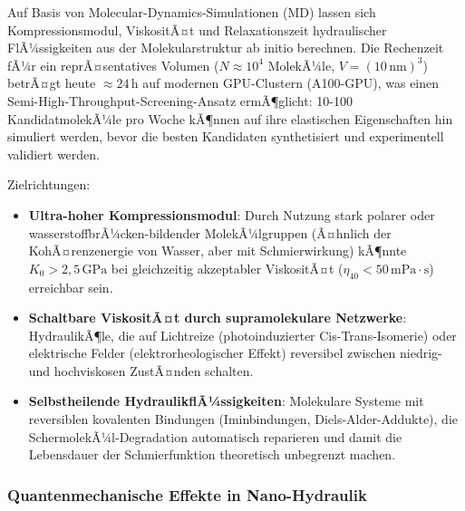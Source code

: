 ﻿\documentclass[a4paper,12pt]{scrreprt}
\theoremstyle{definition}
\begin{document}
Auf Basis von Molecular-Dynamics-Simulationen (MD) lassen sich
Kompressionsmodul, ViskositÃ¤t und Relaxationszeit hydraulischer
FlÃ¼ssigkeiten aus der Molekularstruktur ab initio berechnen.
Die Rechenzeit fÃ¼r ein reprÃ¤sentatives Volumen
($N \approx 10^4$ MolekÃ¼le, $V = (10\,\mathrm{nm})^3$) betrÃ¤gt
heute $\approx 24\,\mathrm{h}$ auf modernen GPU-Clustern (A100-GPU),
was einen Semi-High-Throughput-Screening-Ansatz ermÃ¶glicht:
10-100 KandidatmolekÃ¼le pro Woche kÃ¶nnen auf ihre elastischen
Eigenschaften hin simuliert werden, bevor die besten Kandidaten
synthetisiert und experimentell validiert werden.

Zielrichtungen:
\begin{itemize}
  \item \textbf{Ultra-hoher Kompressionsmodul}: Durch Nutzung
    stark polarer oder wasserstoff\-brÃ¼cken-bildender MolekÃ¼lgruppen
    (Ã¤hnlich der KohÃ¤renzenergie von Wasser, aber mit Schmierwirkung)
    kÃ¶nnte $K_0 > 2{,}5\,\mathrm{GPa}$ bei gleichzeitig akzeptabler
    ViskositÃ¤t ($\eta_{40} < 50\,\mathrm{mPa\cdot s}$) erreichbar sein.
  \item \textbf{Schaltbare ViskositÃ¤t durch supramolekulare Netzwerke}:
    HydraulikÃ¶le, die auf Lichtreize (photoinduzierter Cis-Trans-Isomerie)
    oder elektrische Felder (elektrorheologischer Effekt) reversibel
    zwischen niedrig- und hochviskosen ZustÃ¤nden schalten.
  \item \textbf{Selbstheilende HydraulikflÃ¼ssigkeiten}: Molekulare Systeme
    mit reversiblen kovalenten Bindungen (Iminbindungen, Diels-Alder-Addukte),
    die SchermolekÃ¼l-Degradation automatisch reparieren und damit
    die Lebensdauer der Schmierfunktion theoretisch unbegrenzt machen.
\end{itemize}

\subsubsection{Quantenmechanische Effekte in Nano-Hydraulik}
\end{document}
